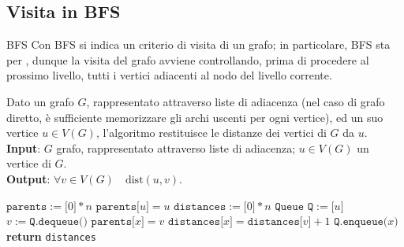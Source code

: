 \documentclass[a4paper, 12pt]{report}
\begin{document}
    \subsection{Visita in BFS}

    \begin{frameddefn}{BFS}
        Con BFS si indica un criterio di visita di un grafo; in particolare, BFS sta per , dunque la visita del grafo avviene controllando, prima di procedere al prossimo livello, tutti i vertici adiacenti al nodo del livello corrente.
    \end{frameddefn}

    \begin{algorithm}[H]
        \caption{
            Dato un grafo $G$, rappresentato attraverso liste di adiacenza (nel caso di grafo diretto, è sufficiente memorizzare gli archi uscenti per ogni vertice), ed un suo vertice $u \in V(G)$, l'algoritmo restituisce le distanze dei vertici di $G$ da $u$.\\
            \textbf{Input}: $G$ grafo, rappresentato attraverso liste di adiacenza; $u \in V(G)$ un vertice di $G$.\\
            \textbf{Output}: $\forall v \in V(G) \quad \mathrm{dist}(u, v)$.
        }

        \begin{algorithmic}[1]
            \label{bfs}

                \State $\texttt{parents}:=\texttt{[}0\texttt{]} * n$
                \State $\texttt{parents[}u\texttt{]} = u$
                \State $\texttt{distances}:=\texttt{[}0\texttt{]} * n$
                \State $\texttt{Queue Q} := \texttt{[}u\texttt{]}$
                    \State $v := \texttt{Q.dequeue()}$
                        \State $\texttt{parents[}x\texttt{]} = v$
                        \State $\texttt{distances[}x\texttt{]}=\texttt{distances[}v\texttt{]} + 1$
                        \State $\texttt{Q.enqueue(}x\texttt{)}$
                    \EndIf
                    \EndFor
                \EndWhile
                \State \textbf{return} \texttt{distances}
            \EndFunction
        \end{algorithmic}
    \end{algorithm}
\end{document}
